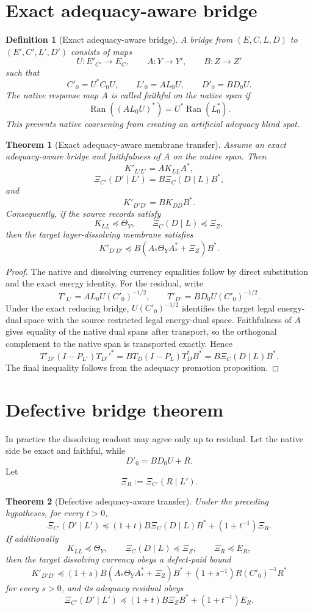 \documentclass[11pt]{article}
\newtheorem{theorem}{Theorem}
\newtheorem{definition}{Definition}
\newcommand{\range}{\operatorname{Ran}}
\begin{document}
\section{Exact adequacy-aware bridge}
\begin{definition}[Exact adequacy-aware bridge]
A bridge from \((E,C,L,D)\) to \((E',C',L',D')\) consists of maps
\[
U:E'_{C'}\to E_C,\qquad A:Y\to Y',\qquad B:Z\to Z'
\]
such that
\[
C'_0=U^*C_0U,
\qquad
L'_0=AL_0U,
\qquad
D'_0=BD_0U.
\]
The native response map \(A\) is called faithful on the native span if
\[
\range((AL_0U)^*)=U^*\range(L_0^*).
\]
This prevents native coarsening from creating an artificial adequacy blind spot.
\end{definition}

\begin{theorem}[Exact adequacy-aware membrane transfer]
Assume an exact adequacy-aware bridge and faithfulness of \(A\) on the native span.  Then
\[
K'_{L'L'}=A K_{LL}A^*,
\]
\[
\Xi_{C'}(D'\mid L')=B\Xi_C(D\mid L)B^*,
\]
and
\[
K'_{D'D'}=B K_{DD}B^*.
\]
Consequently, if the source records satisfy
\[
K_{LL}\preceq\Theta_Y,
\qquad
\Xi_C(D\mid L)\preceq\Xi_Z,
\]
then the target layer-dissolving membrane satisfies
\[
K'_{D'D'}\preceq B(A_*\Theta_YA_*^*+\Xi_Z)B^*.
\]
\end{theorem}

\begin{proof}
The native and dissolving currency equalities follow by direct substitution and the exact energy identity.  For the residual, write
\[
T'_{L'}=AL_0U(C'_0)^{-1/2},\qquad T'_{D'}=BD_0U(C'_0)^{-1/2}.
\]
Under the exact reducing bridge, \(U(C'_0)^{-1/2}\) identifies the target legal energy-dual space with the source restricted legal energy-dual space.  Faithfulness of \(A\) gives equality of the native dual spans after transport, so the orthogonal complement to the native span is transported exactly. Hence
\[
T'_{D'}(I-P_{L'})T_{D'}'^*=B T_D(I-P_L)T_D^*B^*=B\Xi_C(D\mid L)B^*.
\]
The final inequality follows from the adequacy promotion proposition.
\end{proof}

\section{Defective bridge theorem}
In practice the dissolving readout may agree only up to residual.  Let the native side be exact and faithful, while
\[
D'_0=BD_0U+R.
\]
Let
\[
\Xi_R:=\Xi_{C'}(R\mid L').
\]

\begin{theorem}[Defective adequacy-aware transfer]
Under the preceding hypotheses, for every \(t>0\),
\[
\Xi_{C'}(D'\mid L')
\preceq
(1+t)B\Xi_C(D\mid L)B^*+(1+t^{-1})\Xi_R.
\]
If additionally
\[
K_{LL}\preceq\Theta_Y,
\qquad
\Xi_C(D\mid L)\preceq\Xi_Z,
\qquad
\Xi_R\preceq E_R,
\]
then the target dissolving currency obeys a defect-paid bound
\[
K'_{D'D'}\preceq
(1+s)B(A_*\Theta_YA_*^*+\Xi_Z)B^*+(1+s^{-1})R(C'_0)^{-1}R^*
\]
for every \(s>0\), and its adequacy residual obeys
\[
\Xi_{C'}(D'\mid L')
\preceq
(1+t)B\Xi_ZB^*+(1+t^{-1})E_R.
\]
\end{theorem}
\end{document}
